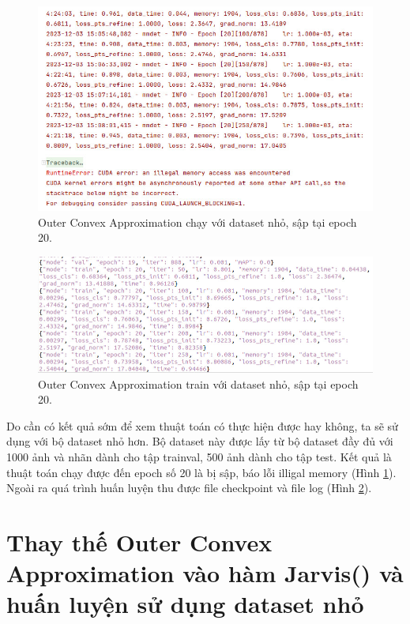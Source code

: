 \documentclass[12pt,a4paper,openany,oneside]{report}
\begin{document}
\begin{figure}[ht!]
	\begin{center}
		\includegraphics[width=450px]{./mmrotate8_1000p_epoch20.JPG}
		\caption{Outer Convex Approximation chạy với dataset nhỏ, sập tại epoch 20.}
		\label{mmrotate8_1000p_epoch20}
	\end{center}
\end{figure} 

\begin{figure}[ht!]
	\begin{center}
		\includegraphics[width=450px]{./ket_qua_file_none_log_json.JPG}
		\caption{Outer Convex Approximation train với dataset nhỏ, sập tại epoch 20.}
		\label{ket_qua_file_none_log_json}
	\end{center}
\end{figure} 

Do cần có kết quả sớm để xem thuật toán có thực hiện được hay không, ta sẽ sử dụng với bộ dataset nhỏ hơn. Bộ dataset này được lấy từ bộ dataset đầy đủ với 1000 ảnh và nhãn dành cho tập trainval, 500 ảnh dành cho tập test. Kết quả là thuật toán chạy được đến epoch số 20 là bị sập, báo lỗi illigal memory (Hình \ref{mmrotate8_1000p_epoch20}). Ngoài ra quá trình huấn luyện thu được file checkpoint  và file log (Hình \ref{ket_qua_file_none_log_json}).

\section{Thay thế Outer Convex Approximation vào hàm Jarvis() và huấn luyện sử dụng dataset nhỏ}
\end{document}
